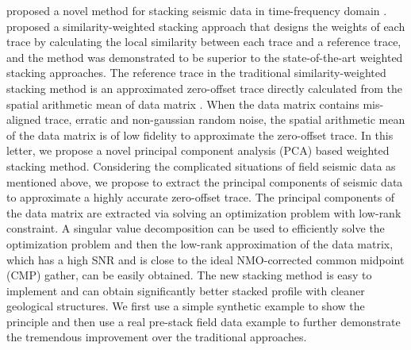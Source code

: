\cite{stackgrsl2014} proposed a novel method for stacking seismic data in time-frequency domain \cite[]{liuwei2016ewt,hongbo2015}. %
\cite{Liu09} proposed a similarity-weighted stacking approach that designs the weights of each trace by calculating the local similarity between each trace and a reference trace, and the method was demonstrated to be superior to the state-of-the-art weighted stacking approaches. %
The reference trace in the traditional similarity-weighted stacking method is an approximated zero-offset trace directly calculated from the spatial arithmetic mean of data matrix \cite[]{ron2010}. When the data matrix contains mis-aligned trace, erratic and non-gaussian random noise, the spatial arithmetic mean of the data matrix is of low fidelity to approximate the zero-offset trace. In this letter, we propose a novel principal component analysis (PCA) \cite[]{farrell2005,duqian2007} based weighted stacking method. Considering the complicated situations of field seismic data as mentioned above, we propose to extract the principal components of seismic data to approximate a highly accurate zero-offset trace. The principal components of the data matrix are extracted via solving an optimization problem with low-rank constraint. A singular value decomposition can be used to efficiently solve the optimization problem and then the low-rank approximation of the data matrix, which has a high SNR and is close to the ideal NMO-corrected common midpoint (CMP) gather, can be easily obtained. The new stacking method is easy to implement and can obtain significantly better stacked profile with cleaner geological structures. %
We first use a simple synthetic example to show the principle and then use a real pre-stack field data example to further demonstrate the tremendous improvement over the traditional approaches.


